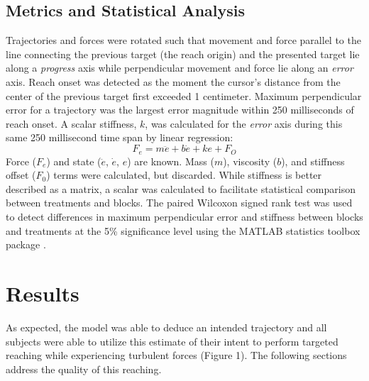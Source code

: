 \documentclass[letterpaper, 10 pt, conference]{ieeeconf}  %
\begin{document}
\subsection*{Metrics and Statistical Analysis}
Trajectories and forces were rotated such that movement and force parallel to the line connecting the previous target (the reach origin) and the presented target lie along a \textit{progress} axis while perpendicular movement and force lie along an \textit{error} axis. Reach onset was detected as the moment the cursor's distance from the center of the previous target first exceeded 1 centimeter. Maximum perpendicular error for a trajectory was the largest error magnitude within 250 milliseconds of reach onset. A scalar stiffness, $k$, was calculated for the \textit{error} axis during this same 250 millisecond time span by linear regression:
\begin{equation}
F_e=m\ddot{e}+b\dot{e}+ke+F_O
\end{equation}
Force ($F_e$) and state ($\ddot{e}$, $\dot{e}$, $e$) are known. Mass ($m$), viscosity ($b$), and stiffness offset ($F_0$) terms were calculated, but discarded. While stiffness is better described as a matrix, a scalar was calculated to facilitate statistical comparison between treatments and blocks. The paired Wilcoxon signed rank test was used to detect differences in maximum perpendicular error and stiffness between blocks and treatments at the 5\% significance level using the MATLAB statistics toolbox package \cite{MATLAB:2014}.

\section{Results}
As expected, the model was able to deduce an intended trajectory and all subjects were able to utilize this estimate of their intent to perform targeted reaching while experiencing turbulent forces (Figure 1). The following sections address the quality of this reaching.
\end{document}
